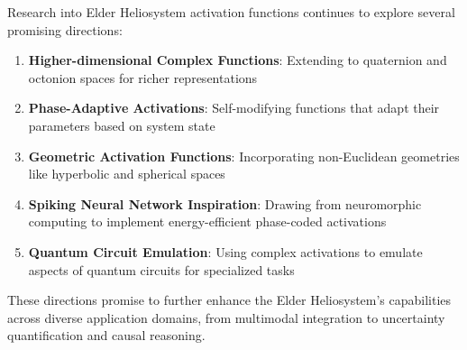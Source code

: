 Research into Elder Heliosystem activation functions continues to explore several promising directions:

\begin{enumerate}
    \item \textbf{Higher-dimensional Complex Functions}: Extending to quaternion and octonion spaces for richer representations
    \item \textbf{Phase-Adaptive Activations}: Self-modifying functions that adapt their parameters based on system state
    \item \textbf{Geometric Activation Functions}: Incorporating non-Euclidean geometries like hyperbolic and spherical spaces
    \item \textbf{Spiking Neural Network Inspiration}: Drawing from neuromorphic computing to implement energy-efficient phase-coded activations
    \item \textbf{Quantum Circuit Emulation}: Using complex activations to emulate aspects of quantum circuits for specialized tasks
\end{enumerate}

These directions promise to further enhance the Elder Heliosystem's capabilities across diverse application domains, from multimodal integration to uncertainty quantification and causal reasoning.